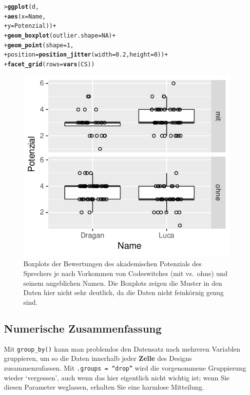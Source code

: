 \documentclass[oneside, 10pt]{book}\usepackage[]{graphicx}\usepackage[]{xcolor}
\makeatletter
\newcommand{\hlnum}[1]{\textcolor[rgb]{0.686,0.059,0.569}{#1}}%
\newcommand{\hlopt}[1]{\textcolor[rgb]{0,0,0}{#1}}%
\newcommand{\hlstd}[1]{\textcolor[rgb]{0.345,0.345,0.345}{#1}}%
\newcommand{\hlkwc}[1]{\textcolor[rgb]{0.333,0.667,0.333}{#1}}%
\newcommand{\hlkwd}[1]{\textcolor[rgb]{0.737,0.353,0.396}{\textbf{#1}}}%
\newenvironment{kframe}{%
 \def\at@end@of@kframe{}%
 \ifinner\ifhmode%
  \def\at@end@of@kframe{\end{minipage}}%
  \begin{minipage}{\columnwidth}%
 \fi\fi%
 \def\FrameCommand##1{\hskip\@totalleftmargin \hskip-\fboxsep
 \colorbox{shadecolor}{##1}\hskip-\fboxsep
     \hskip-\linewidth \hskip-\@totalleftmargin \hskip\columnwidth}%
 \MakeFramed {\advance\hsize-\width
   \@totalleftmargin\z@ \linewidth\hsize
   \@setminipage}}%
 {\par\unskip\endMakeFramed%
 \at@end@of@kframe}
\newenvironment{knitrout}{}{} %
\makeatother
\begin{document}
\begin{knitrout}
\color{fgcolor}\begin{kframe}
\begin{alltt}
\hlstd{> }\hlkwd{ggplot}\hlstd{(d,}
\hlstd{+ }       \hlkwd{aes}\hlstd{(}\hlkwc{x} \hlstd{= Name,}
\hlstd{+ }           \hlkwc{y} \hlstd{= Potenzial))} \hlopt{+}
\hlstd{+ }  \hlkwd{geom_boxplot}\hlstd{(}\hlkwc{outlier.shape} \hlstd{=} \hlnum{NA}\hlstd{)} \hlopt{+}
\hlstd{+ }  \hlkwd{geom_point}\hlstd{(}\hlkwc{shape} \hlstd{=} \hlnum{1}\hlstd{,}
\hlstd{+ }             \hlkwc{position} \hlstd{=} \hlkwd{position_jitter}\hlstd{(}\hlkwc{width} \hlstd{=} \hlnum{0.2}\hlstd{,} \hlkwc{height} \hlstd{=} \hlnum{0}\hlstd{))} \hlopt{+}
\hlstd{+ }  \hlkwd{facet_grid}\hlstd{(}\hlkwc{rows} \hlstd{=} \hlkwd{vars}\hlstd{(CS))}
\end{alltt}
\end{kframe}\begin{figure}[tp]

{\centering \includegraphics[width=.5\textwidth]{figs/unnamed-chunk-272-1} 

}

\caption{Boxplots der Bewertungen des akademischen Potenzials des Sprechers je nach Vorkommen von Codeswitches (mit vs.\ ohne) und seinem angeblichen Namen. Die Boxplots zeigen die Muster in den Daten hier nicht sehr deutlich, da die Daten nicht feinkörnig genug sind.\label{fig:berthelebp1}}\label{fig:unnamed-chunk-272}
\end{figure}

\end{knitrout}

\subsection{Numerische Zusammenfassung}
Mit \texttt{group\_by()} kann man problemlos den Datensatz
nach mehreren Variablen gruppieren, um so die Daten innerhalb
jeder \textbf{Zelle} des Designs zusammenzufassen.
Mit \texttt{.groups = ``drop''} wird die vorgenommene
Gruppierung wieder `vergessen', auch wenn das hier eigentlich
nicht wichtig ist; wenn Sie diesen Parameter weglassen, erhalten
Sie eine harmlose Mitteilung.
\end{document}
